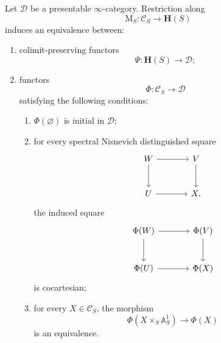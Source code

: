 \begin{theorem}
\label{thm:brave-new-motivic-universal-property}
Let \(\mathcal D\) be a presentable \(\infty\)-category.  Restriction
along
\[
    \mathrm M_S
    \colon
    \mathcal C_S
    \longrightarrow
    \mathbf H(S)
\]
induces an equivalence between:
\begin{enumerate}[label=(\roman*)]
    \item colimit-preserving functors
    \[
        \Psi
        \colon
        \mathbf H(S)
        \longrightarrow
        \mathcal D;
    \]

    \item functors
    \[
        \Phi
        \colon
        \mathcal C_S
        \longrightarrow
        \mathcal D
    \]
    satisfying the following conditions:
    \begin{enumerate}[label=(\alph*)]
        \item \(\Phi(\varnothing)\) is initial in \(\mathcal D\);

        \item for every spectral Nisnevich distinguished square
        \[
        \begin{tikzcd}[column sep=large, row sep=large]
            W \arrow[r] \arrow[d]
            &
            V \arrow[d]
            \\
            U \arrow[r]
            &
            X,
        \end{tikzcd}
        \]
        the induced square
        \[
        \begin{tikzcd}[column sep=large, row sep=large]
            \Phi(W) \arrow[r] \arrow[d]
            &
            \Phi(V) \arrow[d]
            \\
            \Phi(U) \arrow[r]
            &
            \Phi(X)
        \end{tikzcd}
        \]
        is cocartesian;

        \item for every \(X\in\mathcal C_S\), the morphism
        \[
            \Phi(X\times_S\mathbb A^1_S)
            \longrightarrow
            \Phi(X)
        \]
        is an equivalence.
    \end{enumerate}
\end{enumerate}
\end{theorem}

